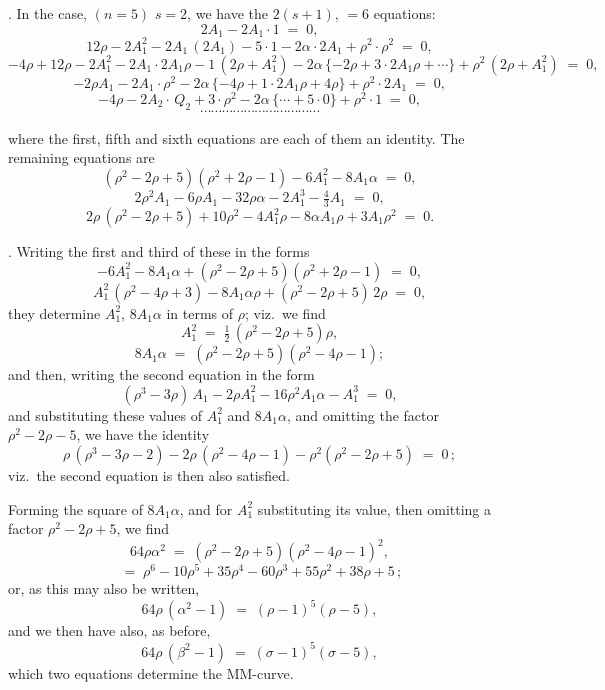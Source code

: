 \documentclass[11pt]{article}
\begin{document}
\medskip

. In the case, $(n = 5)$ $s = 2$, we have the $2(s+1)$, $= 6$ equations:
\[
2 A_1 - 2 A_1\cdot 1 \;=\; 0,
\]
\[
12\rho - 2 A_1^2 - 2 A_1\,(2 A_1) - 5\cdot 1 - 2\alpha\cdot 2 A_1 + \rho^2\cdot\rho^2 \;=\; 0,
\]
\[
-4\rho + 12\rho - 2 A_1^2 - 2 A_1\cdot 2 A_1\rho - 1\,(2\rho + A_1^2) - 2\alpha\,\{-2\rho + 3\cdot 2 A_1\rho + \cdots\} + \rho^2\,(2\rho + A_1^2) \;=\; 0,
\]
\[
-2\rho A_1 - 2 A_1\cdot\rho^2 - 2\alpha\,\{-4\rho + 1\cdot 2 A_1\rho + 4\rho\} + \rho^2\cdot 2 A_1 \;=\; 0,
\]
\[
-4\rho - 2 A_2\cdot\,Q_2 + 3\cdot\rho^2 - 2\alpha\,\{\cdots + 5\cdot 0\} + \rho^2\cdot 1 \;=\; 0,
\]
\[
\cdots\cdots\cdots\cdots\cdots\cdots\cdots\cdots\cdots\cdots\cdots
\]

\newpage

\noindent where the first, fifth and sixth equations are each of them an identity. The remaining equations are
\[
(\rho^2 - 2\rho + 5)(\rho^2 + 2\rho - 1) - 6 A_1^2 - 8 A_1\alpha \;=\; 0,
\]
\[
2\rho^2 A_1 - 6\rho A_1 - 32\rho\alpha - 2 A_1^3 - \tfrac{4}{3} A_1 \;=\; 0,
\]
\[
2\rho\,(\rho^2 - 2\rho + 5) + 10\rho^2 - 4 A_1^2\rho - 8\alpha A_1\rho + 3 A_1\rho^2 \;=\; 0.
\]

\medskip

. Writing the first and third of these in the forms
\[
- 6 A_1^2 - 8 A_1\alpha + (\rho^2 - 2\rho + 5)(\rho^2 + 2\rho - 1) \;=\; 0,
\]
\[
A_1^2\,(\rho^2 - 4\rho + 3) - 8 A_1\alpha\rho + (\rho^2 - 2\rho + 5)\,2\rho \;=\; 0,
\]
they determine $A_1^2$, $8 A_1\alpha$ in terms of $\rho$; viz.\ we find
\[
A_1^2 \;=\; \tfrac{1}{2}\,(\rho^2 - 2\rho + 5)\rho,
\]
\[
8 A_1\alpha \;=\; (\rho^2 - 2\rho + 5)(\rho^2 - 4\rho - 1);
\]
and then, writing the second equation in the form
\[
(\rho^3 - 3\rho)\,A_1 - 2\rho A_1^2 - 16\rho^2 A_1\alpha - A_1^3 \;=\; 0,
\]
and substituting these values of $A_1^2$ and $8 A_1\alpha$, and omitting the factor $\rho^2 - 2\rho - 5$, we have the identity
\[
\rho\,(\rho^3 - 3\rho - 2) - 2\rho\,(\rho^2 - 4\rho - 1) - \rho^2(\rho^2 - 2\rho + 5) \;=\; 0\,;
\]
viz.\ the second equation is then also satisfied.

\medskip

\noindent Forming the square of $8 A_1\alpha$, and for $A_1^2$ substituting its value, then omitting a factor $\rho^2 - 2\rho + 5$, we find
\[
64\rho\alpha^2 \;=\; (\rho^2 - 2\rho + 5)(\rho^2 - 4\rho - 1)^2,
\]
\[
\;=\; \rho^6 - 10\rho^5 + 35\rho^4 - 60\rho^3 + 55\rho^2 + 38\rho + 5\,;
\]
or, as this may also be written,
\[
64\rho\,(\alpha^2 - 1) \;=\; (\rho - 1)^5(\rho - 5),
\]
and we then have also, as before,
\[
64\rho\,(\beta^2 - 1) \;=\; (\sigma - 1)^5(\sigma - 5),
\]
which two equations determine the MM-curve.
\end{document}
